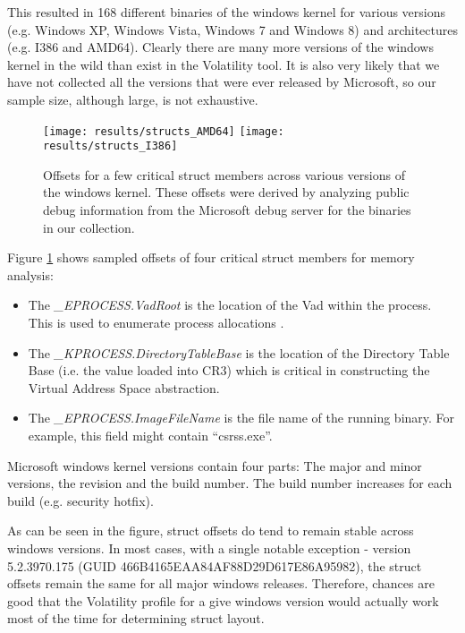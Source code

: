 This resulted in 168 different binaries of the windows kernel for various
versions (e.g. Windows XP, Windows Vista, Windows 7 and Windows 8) and
architectures (e.g. I386 and AMD64). Clearly there are many more versions of the
windows kernel in the wild than exist in the Volatility tool. It is also very
likely that we have not collected all the versions that were ever released by
Microsoft, so our sample size, although large, is not exhaustive.

\begin{figure}[tb]
\begin{center}
\texttt{[image: results/structs\_AMD64]}
\texttt{[image: results/structs\_I386]}
\caption{Offsets for a few critical struct members across various versions of
  the windows kernel. These offsets were derived by analyzing public debug
  information from the Microsoft debug server for the binaries in our
  collection.
}
\label{graph_structs}
\end{center}
\end{figure}

Figure \ref{graph_structs} shows sampled offsets of four critical struct members
for memory analysis:
\begin{itemize}
\item The {\em \_EPROCESS.VadRoot} is the location of the Vad within the
  process. This is used to enumerate process allocations \citep{dolan2007vad}.

\item The {\em \_KPROCESS.DirectoryTableBase} is the location of the Directory
  Table Base (i.e. the value loaded into CR3) which is critical in constructing
  the Virtual Address Space abstraction.

\item The {\em \_EPROCESS.ImageFileName} is the file name of the running
  binary. For example, this field might contain ``csrss.exe''.
\end{itemize}

Microsoft windows kernel versions contain four parts: The major and minor
versions, the revision and the build number. The build number increases for each
build (e.g. security hotfix).

As can be seen in the figure, struct offsets do tend to remain stable across
windows versions. In most cases, with a single notable exception - version
5.2.3970.175 (GUID 466B4165EAA84AF88D29D617E86A95982), the struct offsets remain
the same for all major windows releases. Therefore, chances are good that the
Volatility profile for a give windows version would actually work most of the
time for determining struct layout.

